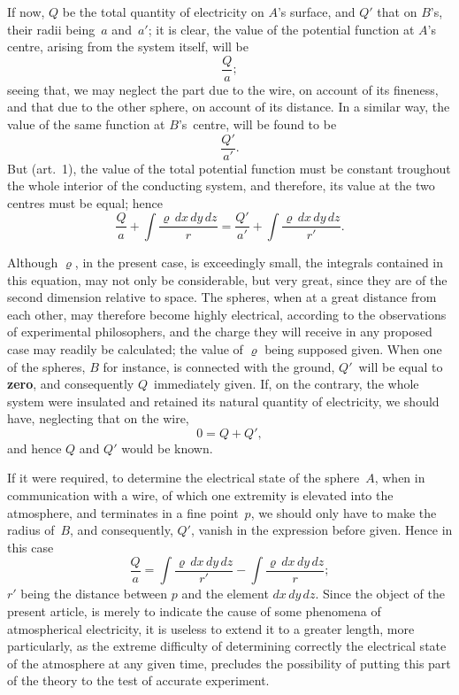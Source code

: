 \documentclass[12pt,notitlepage]{amsart}
\let\Emphasis\textbf
\renewcommand{\rho}{\varrho}
\begin{document}
If now, $Q$ be the total quantity of electricity on $A$'s surface, and $Q'$
that on $B$'s, their radii being~$a$ and~$a'$;
it is clear, the value of the potential
function at $A$'s centre, arising from the system itself, will be
\[
\frac{Q}{a};
\]
seeing that, we may neglect the part due to the wire, on account of its
fineness, and that due to the other sphere, on account of its distance. In a
similar way, the value of the same function at $B$'s~centre, will be found to be
\[
\frac{Q'}{a'}.
\]
But (art.~1), the value of the total potential function must be
constant troughout
the whole interior of the conducting system, and therefore, its value at the
two centres must be equal; hence
\[
\frac{Q}{a}+
\int\frac{\rho\,dx\,dy\,dz}{r}
=\frac{Q'}{a'}+
\int\frac{\rho\,dx\,dy\,dz}{r'}.
\]

Although $\rho$, in the present case, is exceedingly small, the integrals
contained in this equation, may not only be considerable, but very great, since
they are of the second dimension relative to space. The spheres, when at
a great distance from each other, may therefore become highly electrical,
according to the observations of experimental philosophers, and the charge
they will receive in any proposed case may readily be calculated; the value
of $\rho$ being supposed given. When one of the spheres, $B$ for instance, is
connected with the ground, $Q'$~will be equal to \Emphasis{zero},
and consequently
$Q$~immediately given. If, on the contrary, the whole system were insulated and
retained its natural quantity of electricity, we should have, neglecting that
on the wire,
\[
0=Q+Q',
\]
and hence $Q$ and $Q'$ would be known.

If it were required, to determine the electrical state of the sphere~$A$,
when in communication with a wire, of which one extremity is elevated into
the atmosphere, and terminates in a fine point~$p$, we should only have to
make the radius of~$B$, and consequently, $Q'$, vanish in the expression before
given. Hence in this case
\[
\frac{Q}{a}=
\int\frac{\rho\,dx\,dy\,dz}{r'}
-\int\frac{\rho\,dx\,dy\,dz}{r};
\]
$r'$ being the distance between $p$ and the element $dx\,dy\,dz$.
Since the object
of the present article, is merely to indicate the cause of some phenomena of
atmospherical electricity, it is useless to extend it to a greater length, more
particularly, as the extreme difficulty of determining correctly the electrical
state of the atmosphere at any given time, precludes the possibility of putting
this part of the theory to the test of accurate experiment.
\bigskip
\end{document}
